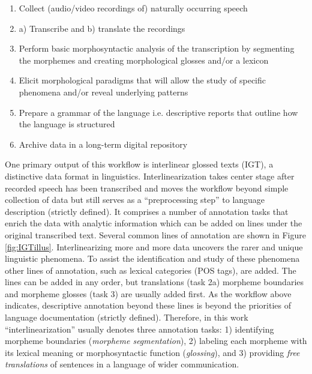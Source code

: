\begin{enumerate}
    \item Collect (audio/video recordings of) naturally occurring speech
    \item a) Transcribe and b) translate the recordings
    \item Perform basic morphosyntactic analysis of the transcription by segmenting the morphemes and creating morphological glosses and/or a lexicon
    \item Elicit morphological paradigms that will allow the study of specific phenomena and/or reveal underlying patterns
    \item Prepare a grammar of the language i.e. descriptive reports that outline how the language is structured
    \item Archive data in a long-term digital repository
\end{enumerate}

One primary output of this workflow is interlinear glossed texts (IGT), a distinctive data format in linguistics. 
Interlinearization takes center stage after recorded speech has been transcribed and moves the workflow beyond simple collection of data but still serves as a ``preprocessing step'' to \citep{moon_unsupervised_2009} language description (strictly defined). It comprises a number of annotation tasks that enrich the data with analytic information which can be added on lines under the original transcribed text. Several common lines of annotation are shown in Figure \ref{fig:IGTillus}. Interlinearizing more and more data uncovers the rarer and unique linguistic phenomena. To assist the identification and study of these phenomena other lines of annotation, such as lexical categories (POS tags), are added. The lines can be added in any order, but translations (task 2a) morpheme boundaries and morpheme glosses (task 3) are usually added first. As the workflow above indicates, descriptive annotation beyond these lines is beyond the priorities of language documentation (strictly defined). Therefore, in this work ``interlinearization'' usually denotes three annotation tasks: 1) identifying morpheme boundaries (\emph{morpheme segmentation}), 2) labeling each morpheme with its lexical meaning or morphosyntactic function (\emph{glossing}), and 3) providing \emph{free translations} of sentences in a language of wider communication.  


